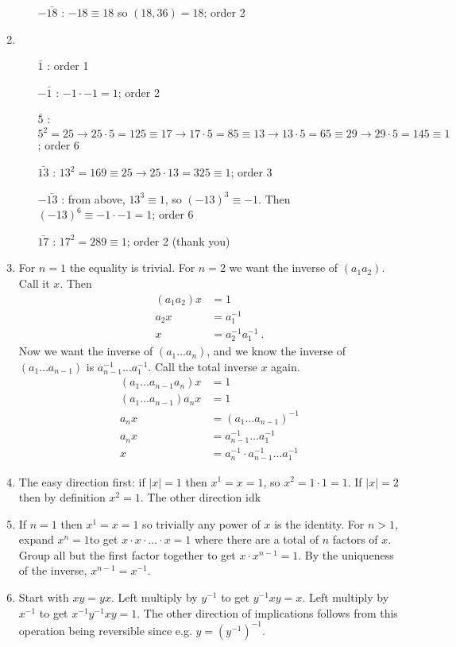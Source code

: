 \documentclass[]{article}
\newcommand{\abs}[1]{\left\vert #1 \right\vert}
\begin{document}
\begin{enumerate}
\begin{enumerate}
\item[$-\bar{18}$]: $-18 \equiv 18$ so $(18,36) = 18$; order 2
\end{enumerate}
\item \begin{enumerate}
\item[$\bar{1}$]: order 1
\item[$-\bar{1}$]: $-1\cdot -1 = 1$; order 2
\item[$\bar{5}$]: $5^2 = 25 \rightarrow 25\cdot 5 = 125 \equiv 17 \rightarrow 17\cdot 5 = 85 \equiv 13 \rightarrow 13\cdot 5 = 65 \equiv 29 \rightarrow 29\cdot 5 = 145 \equiv 1$; order 6
\item[$\bar{13}$]: $13^2 = 169 \equiv 25 \rightarrow 25\cdot 13 = 325 \equiv 1$; order 3
\item[$-\bar{13}$]: from above, $13^3 \equiv 1$, so $(-13)^3 \equiv -1$. Then $(-13)^6 \equiv -1\cdot -1 = 1$; order 6
\item[$\bar{17}$]: $17^2 = 289 \equiv 1$; order 2 (thank you)
\end{enumerate}
\item For $n=1$ the equality is trivial. For $n=2$ we want the inverse of $(a_1a_2)$. Call it $x$. Then
\begin{align}
(a_1a_2)x &= 1 \\
a_2 x &= a_1^{-1} \\
x &= a_2^{-1} a_1^{-1}\ .
\end{align}
Now we want the inverse of $(a_1\ldots a_n)$, and we know the inverse of $(a_1\ldots a_{n-1})$ is $a_{n-1}^{-1}\ldots a_1^{-1}$. Call the total inverse $x$ again.
\begin{align}
(a_1\ldots a_{n-1}a_n)x &= 1 \\
(a_1\ldots a_{n-1})a_nx &= 1 \\
a_nx &= (a_1\ldots a_{n-1})^{-1} \\
a_nx &= a_{n-1}^{-1}\ldots a_1^{-1} \\
x &= a_n^{-1}\cdot a_{n-1}^{-1}\ldots a_1^{-1}
\end{align}
\item The easy direction first: if $\abs{x} = 1$ then $x^1 = x = 1$, so $x^2 = 1\cdot 1 = 1$. If $\abs{x} = 2$ then by definition $x^2 = 1$. {\color{red} The other direction idk}
\item If $n=1$ then $x^1 = x = 1$ so trivially any power of $x$ is the identity. For $n>1$, expand $x^n = 1$to get $x \cdot x \cdot \ldots \cdot x = 1$ where there are a total of $n$ factors of $x$. Group all but the first factor together to get $x \cdot x^{n-1} = 1$. By the uniqueness of the inverse, $x^{n-1} = x^{-1}$.
\item Start with $xy = yx$. Left multiply by $y^{-1}$ to get $y^{-1}xy = x$. Left multiply by $x^{-1}$ to get $x^{-1}y^{-1}xy = 1$. The other direction of implications follows from this operation being reversible since e.g. $y = \left( y^{-1} \right)^{-1}$.
\end{enumerate}
\end{document}
